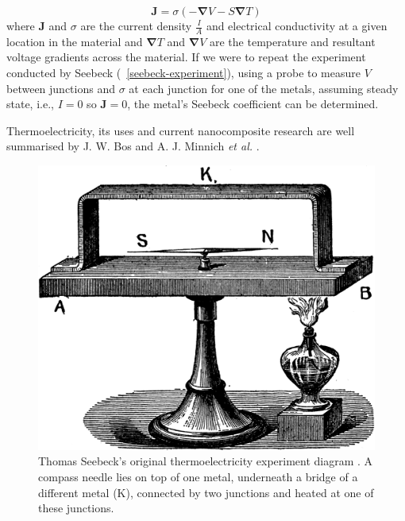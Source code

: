 \documentclass[12pt,titlepage,draft]{article}
\newcommand{\figref}[2][\figurename~]{#1\ref{#2}}
\renewcommand{\vec}[1]{\mathbf{#1}}
\begin{document}
\begin{equation}
\label{current-density}
	\vec{J} = \sigma (-\vec{\nabla} V - S \vec{\nabla} T)
\end{equation}
where $\vec{J}$ and $\sigma$ are the current density $\frac{I}{A}$ and electrical conductivity at a given location in the material and $\vec{\nabla} T$ and $\vec{\nabla} V$ are the temperature and resultant voltage gradients across the material. If we were to repeat the experiment conducted by Seebeck (\figref{seebeck-experiment}), using a probe to measure $V$ between junctions and $\sigma$ at each junction for one of the metals, assuming steady state, i.e., $I=0$ so $\vec{J} = 0$, the metal's Seebeck coefficient can be determined.

Thermoelectricity, its uses and current nanocomposite research are well summarised by J. W. Bos \cite{bos-review} and A. J. Minnich \emph{et al.} \cite{minnich-review}.

\begin{figure}
	\label{fig:seebeck-experiment}
	\centering
	\includegraphics[width=\textwidth]{seebeck-experiment-black.png}
	\caption{Thomas Seebeck's original thermoelectricity experiment diagram \cite{seebeck-original}. A compass needle lies on top of one metal, underneath a bridge of a different metal (K), connected by two junctions and heated at one of these junctions.}
\end{figure}
\end{document}
